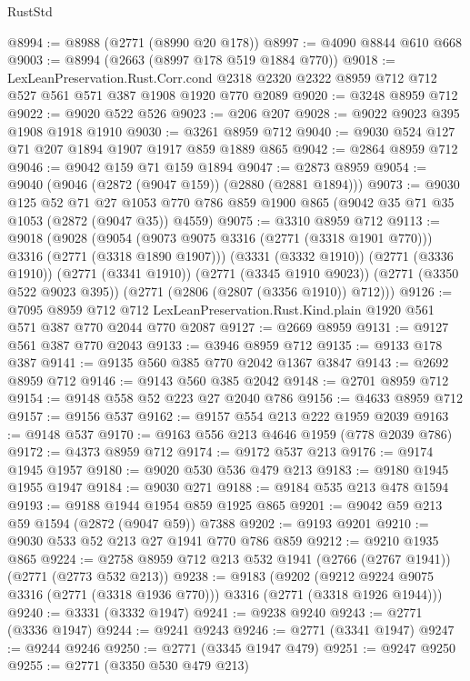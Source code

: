 \begin{lexlean}{RustStd}
\begin{coremodule}
@8994 := @8988 (@2771 (@8990 @20 @178))
@8997 := @4090 @8844 @610 @668
@9003 := @8994 (@2663 (@8997 @178 @519 @1884 @770))
@9018 := LexLeanPreservation.Rust.Corr.cond
    @2318
    @2320
    @2322
    @8959
    @712
    @712
    @527
    @561
    @571
    @387
    @1908
    @1920
    @770
    @2089
@9020 := @3248 @8959 @712
@9022 := @9020 @522 @526
@9023 := @206 @207
@9028 := @9022 @9023 @395 @1908 @1918 @1910
@9030 := @3261 @8959 @712
@9040 := @9030 @524 @127 @71 @207 @1894 @1907 @1917 @859 @1889 @865
@9042 := @2864 @8959 @712
@9046 := @9042 @159 @71 @159 @1894
@9047 := @2873 @8959
@9054 := @9040 (@9046 (@2872 (@9047 @159)) (@2880 (@2881 @1894)))
@9073 := @9030
    @125
    @52
    @71
    @27
    @1053
    @770
    @786
    @859
    @1900
    @865
    (@9042 @35 @71 @35 @1053 (@2872 (@9047 @35)) @4559)
@9075 := @3310 @8959 @712
@9113 := @9018
    (@9028
      (@9054 (@9073 @9075 @3316 (@2771 (@3318 @1901 @770))) @3316 (@2771 (@3318 @1890 @1907)))
      (@3331 (@3332 @1910))
      (@2771 (@3336 @1910))
      (@2771 (@3341 @1910))
      (@2771 (@3345 @1910 @9023))
      (@2771 (@3350 @522 @9023 @395))
      (@2771 (@2806 (@2807 (@3356 @1910)) @712)))
@9126 := @7095
    @8959
    @712
    @712
    LexLeanPreservation.Rust.Kind.plain
    @1920
    @561
    @571
    @387
    @770
    @2044
    @770
    @2087
@9127 := @2669 @8959
@9131 := @9127 @561 @387 @770 @2043
@9133 := @3946 @8959 @712
@9135 := @9133 @178 @387
@9141 := @9135 @560 @385 @770 @2042 @1367 @3847
@9143 := @2692 @8959 @712
@9146 := @9143 @560 @385 @2042
@9148 := @2701 @8959 @712
@9154 := @9148 @558 @52 @223 @27 @2040 @786
@9156 := @4633 @8959 @712
@9157 := @9156 @537
@9162 := @9157 @554 @213 @222 @1959 @2039
@9163 := @9148 @537
@9170 := @9163 @556 @213 @4646 @1959 (@778 @2039 @786)
@9172 := @4373 @8959 @712
@9174 := @9172 @537 @213
@9176 := @9174 @1945 @1957
@9180 := @9020 @530 @536 @479 @213
@9183 := @9180 @1945 @1955 @1947
@9184 := @9030 @271
@9188 := @9184 @535 @213 @478 @1594
@9193 := @9188 @1944 @1954 @859 @1925 @865
@9201 := @9042 @59 @213 @59 @1594 (@2872 (@9047 @59)) @7388
@9202 := @9193 @9201
@9210 := @9030 @533 @52 @213 @27 @1941 @770 @786 @859
@9212 := @9210 @1935 @865
@9224 := @2758 @8959 @712 @213 @532 @1941 (@2766 (@2767 @1941)) (@2771 (@2773 @532 @213))
@9238 := @9183
    (@9202 (@9212 @9224 @9075 @3316 (@2771 (@3318 @1936 @770))) @3316 (@2771 (@3318 @1926 @1944)))
@9240 := @3331 (@3332 @1947)
@9241 := @9238 @9240
@9243 := @2771 (@3336 @1947)
@9244 := @9241 @9243
@9246 := @2771 (@3341 @1947)
@9247 := @9244 @9246
@9250 := @2771 (@3345 @1947 @479)
@9251 := @9247 @9250
@9255 := @2771 (@3350 @530 @479 @213)

\end{coremodule}
\end{lexlean}
